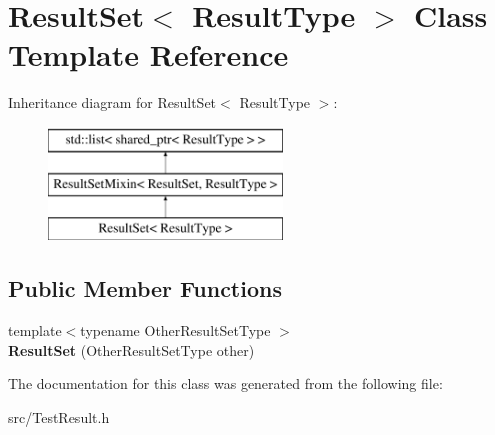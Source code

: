 \hypertarget{class_result_set}{\section{Result\-Set$<$ Result\-Type $>$ Class Template Reference}
\label{class_result_set}
}
Inheritance diagram for Result\-Set$<$ Result\-Type $>$\-:\begin{figure}[H]
\begin{center}
\leavevmode
\includegraphics[height=3.000000cm]{class_result_set}
\end{center}
\end{figure}
\subsection*{Public Member Functions}
\begin{DoxyCompactItemize}
\item 
\hypertarget{class_result_set_a7a40852739269b24e7e684158542a588}{{\footnotesize template$<$typename Other\-Result\-Set\-Type $>$ }\\{\bfseries Result\-Set} (Other\-Result\-Set\-Type other)}\label{class_result_set_a7a40852739269b24e7e684158542a588}

\end{DoxyCompactItemize}


The documentation for this class was generated from the following file\-:\begin{DoxyCompactItemize}
\item 
src/Test\-Result.\-h\end{DoxyCompactItemize}
